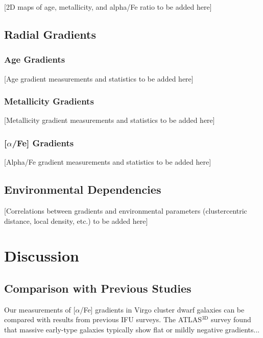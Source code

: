\documentclass[linenumbers,trackchanges,twocolumn]{aastex631}
\begin{document}
[2D maps of age, metallicity, and alpha/Fe ratio to be added here]

\subsection{Radial Gradients}

\subsubsection{Age Gradients}
[Age gradient measurements and statistics to be added here]

\subsubsection{Metallicity Gradients}
[Metallicity gradient measurements and statistics to be added here]

\subsubsection{[$\alpha$/Fe] Gradients}
[Alpha/Fe gradient measurements and statistics to be added here]

\subsection{Environmental Dependencies}

[Correlations between gradients and environmental parameters (clustercentric distance, local density, etc.) to be added here]

\section{Discussion}

\subsection{Comparison with Previous Studies}

Our measurements of [$\alpha$/Fe] gradients in Virgo cluster dwarf galaxies can be compared with results from previous IFU surveys. The ATLAS$^{3\mathrm{D}}$ survey \citep{McDermid_2015} found that massive early-type galaxies typically show flat or mildly negative gradients...
\end{document}
